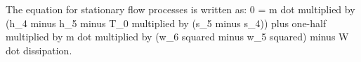 The equation for stationary flow processes is written as:  
0 = m dot multiplied by (h_4 minus h_5 minus T_0 multiplied by (s_5 minus s_4)) plus one-half multiplied by m dot multiplied by (w_6 squared minus w_5 squared) minus W dot dissipation.